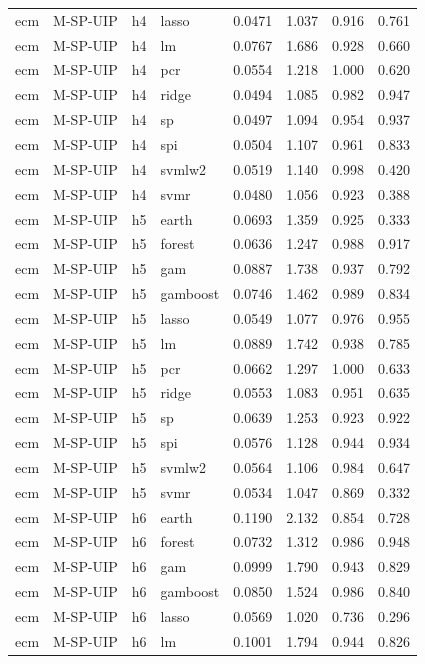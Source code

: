 \begin{ThreePartTable}
\begin{longtable}[t]{llclcccc}
ecm & M-SP-UIP & h4 & lasso & 0.0471 & 1.037 & 0.916 & 0.761\\
ecm & M-SP-UIP & h4 & lm & 0.0767 & 1.686 & 0.928 & 0.660\\
ecm & M-SP-UIP & h4 & pcr & 0.0554 & 1.218 & 1.000 & 0.620\\
ecm & M-SP-UIP & h4 & ridge & 0.0494 & 1.085 & 0.982 & 0.947\\
ecm & M-SP-UIP & h4 & sp & 0.0497 & 1.094 & 0.954 & 0.937\\
ecm & M-SP-UIP & h4 & spi & 0.0504 & 1.107 & 0.961 & 0.833\\
ecm & M-SP-UIP & h4 & svmlw2 & 0.0519 & 1.140 & 0.998 & 0.420\\
ecm & M-SP-UIP & h4 & svmr & 0.0480 & 1.056 & 0.923 & 0.388\\
\addlinespace
ecm & M-SP-UIP & h5 & earth & 0.0693 & 1.359 & 0.925 & 0.333\\
ecm & M-SP-UIP & h5 & forest & 0.0636 & 1.247 & 0.988 & 0.917\\
ecm & M-SP-UIP & h5 & gam & 0.0887 & 1.738 & 0.937 & 0.792\\
ecm & M-SP-UIP & h5 & gamboost & 0.0746 & 1.462 & 0.989 & 0.834\\
ecm & M-SP-UIP & h5 & lasso & 0.0549 & 1.077 & 0.976 & 0.955\\
ecm & M-SP-UIP & h5 & lm & 0.0889 & 1.742 & 0.938 & 0.785\\
ecm & M-SP-UIP & h5 & pcr & 0.0662 & 1.297 & 1.000 & 0.633\\
ecm & M-SP-UIP & h5 & ridge & 0.0553 & 1.083 & 0.951 & 0.635\\
ecm & M-SP-UIP & h5 & sp & 0.0639 & 1.253 & 0.923 & 0.922\\
ecm & M-SP-UIP & h5 & spi & 0.0576 & 1.128 & 0.944 & 0.934\\
ecm & M-SP-UIP & h5 & svmlw2 & 0.0564 & 1.106 & 0.984 & 0.647\\
ecm & M-SP-UIP & h5 & svmr & 0.0534 & 1.047 & 0.869 & 0.332\\
\addlinespace
ecm & M-SP-UIP & h6 & earth & 0.1190 & 2.132 & 0.854 & 0.728\\
ecm & M-SP-UIP & h6 & forest & 0.0732 & 1.312 & 0.986 & 0.948\\
ecm & M-SP-UIP & h6 & gam & 0.0999 & 1.790 & 0.943 & 0.829\\
ecm & M-SP-UIP & h6 & gamboost & 0.0850 & 1.524 & 0.986 & 0.840\\
ecm & M-SP-UIP & h6 & lasso & 0.0569 & 1.020 & 0.736 & 0.296\\
ecm & M-SP-UIP & h6 & lm & 0.1001 & 1.794 & 0.944 & 0.826\\

\end{longtable}
\end{ThreePartTable}
